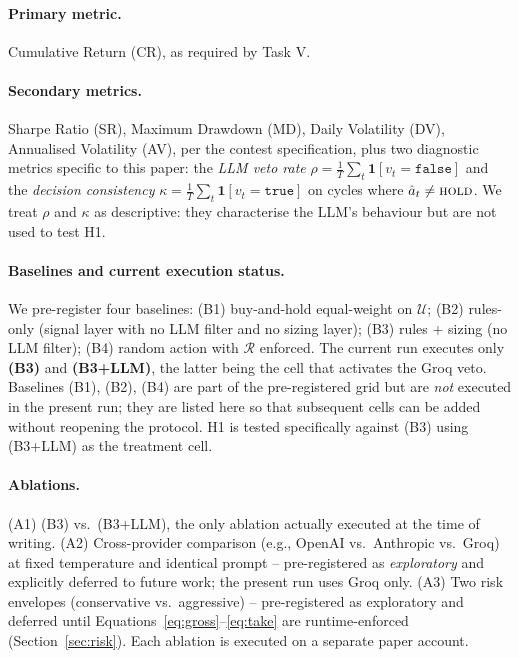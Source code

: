 \documentclass{article}
\begin{document}
\paragraph{Primary metric.} Cumulative Return (CR), as required by Task V.

\paragraph{Secondary metrics.} Sharpe Ratio (SR), Maximum Drawdown (MD), Daily Volatility (DV), Annualised Volatility (AV), per the contest specification, plus two diagnostic metrics specific to this paper: the \emph{LLM veto rate} $\rho = \frac{1}{T} \sum_t \mathbf{1}[v_t = \texttt{false}]$ and the \emph{decision consistency} $\kappa = \frac{1}{T} \sum_t \mathbf{1}[v_t = \texttt{true}]$ on cycles where $\hat{a}_t \neq \textsc{hold}$. We treat $\rho$ and $\kappa$ as descriptive: they characterise the LLM\textquoteright s behaviour but are not used to test H1.

\paragraph{Baselines and current execution status.} We pre-register four baselines: (B1) buy-and-hold equal-weight on $\mathcal{U}$; (B2) rules-only (signal layer with no LLM filter and no sizing layer); (B3) rules + sizing (no LLM filter); (B4) random action with $\mathcal{R}$ enforced. The current run executes only \textbf{(B3)} and \textbf{(B3+LLM)}, the latter being the cell that activates the Groq veto. Baselines (B1), (B2), (B4) are part of the pre-registered grid but are \emph{not} executed in the present run; they are listed here so that subsequent cells can be added without reopening the protocol. H1 is tested specifically against (B3) using (B3+LLM) as the treatment cell.

\paragraph{Ablations.} (A1) (B3) vs.\ (B3+LLM), the only ablation actually executed at the time of writing. (A2) Cross-provider comparison (e.g., OpenAI vs.\ Anthropic vs.\ Groq) at fixed temperature and identical prompt -- pre-registered as \emph{exploratory} and explicitly deferred to future work; the present run uses Groq only. (A3) Two risk envelopes (conservative vs.\ aggressive) -- pre-registered as exploratory and deferred until Equations~\eqref{eq:gross}--\eqref{eq:take} are runtime-enforced (Section~\ref{sec:risk}). Each ablation is executed on a separate paper account.
\end{document}
